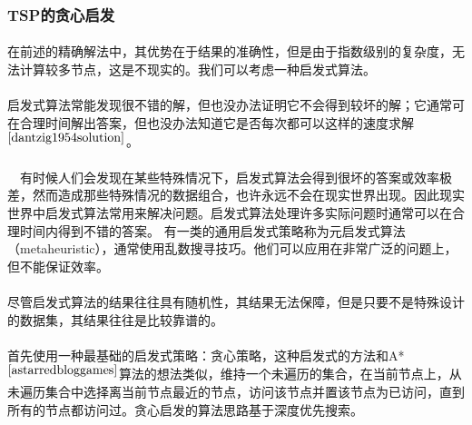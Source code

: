 \documentclass[UTF8,a4paper]{ctexart}
\begin{document}
\subsubsection{TSP的贪心启发}
\paragraph{}在前述的精确解法中，其优势在于结果的准确性，但是由于指数级别的复杂度，无法计算较多节点，这是不现实的。我们可以考虑一种启发式算法。
\paragraph{}启发式算法常能发现很不错的解，但也没办法证明它不会得到较坏的解；它通常可在合理时间解出答案，但也没办法知道它是否每次都可以这样的速度求解$^{\cite{dantzig1954solution}}$。
\paragraph{}　有时候人们会发现在某些特殊情况下，启发式算法会得到很坏的答案或效率极差，然而造成那些特殊情况的数据组合，也许永远不会在现实世界出现。因此现实世界中启发式算法常用来解决问题。启发式算法处理许多实际问题时通常可以在合理时间内得到不错的答案。 有一类的通用启发式策略称为元启发式算法（metaheuristic），通常使用乱数搜寻技巧。他们可以应用在非常广泛的问题上，但不能保证效率。
\paragraph{}尽管启发式算法的结果往往具有随机性，其结果无法保障，但是只要不是特殊设计的数据集，其结果往往是比较靠谱的。
\paragraph{}首先使用一种最基础的启发式策略：贪心策略，这种启发式的方法和A*~$^{\cite{astarredbloggames}}$算法的想法类似，维持一个未遍历的集合，在当前节点上，从未遍历集合中选择离当前节点最近的节点，访问该节点并置该节点为已访问，直到所有的节点都访问过。贪心启发的算法思路基于深度优先搜索。
\end{document}
